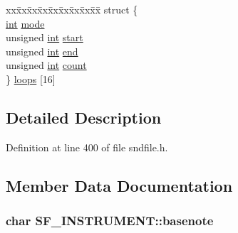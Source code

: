 \begin{DoxyCompactItemize}
\begin{tabbing}
\end{tabbing}\item 
\begin{tabbing}
xx\=xx\=xx\=xx\=xx\=xx\=xx\=xx\=xx\=\kill
struct \{\\
\>\hyperlink{xmltok_8h_a5a0d4a5641ce434f1d23533f2b2e6653}{int} \hyperlink{struct_s_f___i_n_s_t_r_u_m_e_n_t_af222d1a939525fe44aa377ff764570be}{mode}\\
\>unsigned \hyperlink{xmltok_8h_a5a0d4a5641ce434f1d23533f2b2e6653}{int} \hyperlink{struct_s_f___i_n_s_t_r_u_m_e_n_t_a4053f5d0ec83a281264dfd9c17ae921c}{start}\\
\>unsigned \hyperlink{xmltok_8h_a5a0d4a5641ce434f1d23533f2b2e6653}{int} \hyperlink{struct_s_f___i_n_s_t_r_u_m_e_n_t_aaae008f486b2db6b71564456736634a2}{end}\\
\>unsigned \hyperlink{xmltok_8h_a5a0d4a5641ce434f1d23533f2b2e6653}{int} \hyperlink{struct_s_f___i_n_s_t_r_u_m_e_n_t_af1a76686638c1d4d722a543cc09ca9bc}{count}\\
\} \hyperlink{struct_s_f___i_n_s_t_r_u_m_e_n_t_a4972c8c72d790efa52c6e4982338e7af}{loops} \mbox{[}16\mbox{]}\\

\end{tabbing}\end{DoxyCompactItemize}


\subsection{Detailed Description}


Definition at line 400 of file sndfile.\+h.



\subsection{Member Data Documentation}
\subsubsection[{\texorpdfstring{basenote}{basenote}}]{\setlength{\rightskip}{0pt plus 5cm}char S\+F\+\_\+\+I\+N\+S\+T\+R\+U\+M\+E\+N\+T\+::basenote}\hypertarget{struct_s_f___i_n_s_t_r_u_m_e_n_t_ab131f2d1e1297b20b9b64596bd9fef2c}{}\label{struct_s_f___i_n_s_t_r_u_m_e_n_t_ab131f2d1e1297b20b9b64596bd9fef2c}


